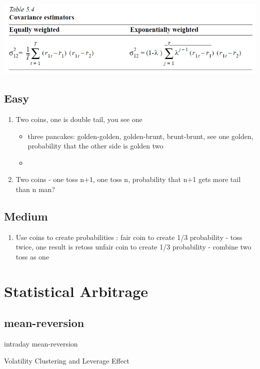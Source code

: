 \documentclass[11pt, openany]{book}              %
\begin{document}
\includegraphics[scale=0.5]{Cov.JPG}

\section{Easy}
\begin{enumerate}
 \item Two coins, one is double tail, you see one \\
  \begin{itemize}
    \item three pancakes: golden-golden, golden-brunt, brunt-brunt, see one golden, probability that the other side is golden two
    \item 
   \end{itemize}
 \item Two coins - one toss n+1, one toss n, probability that n+1 gets more tail than n man?
\end{enumerate}


\section{Medium}
\begin{enumerate}
	\item Use coins to create probabilities : fair coin to create 1/3 probability - toss twice, one result is retoss
unfair coin to create 1/3 probability - combine two toss as one


 \end{enumerate}
 


\chapter{Statistical Arbitrage}

\section{mean-reversion}

intraday mean-reversion

Volatility Clustering and Leverage Effect 
\end{document}
